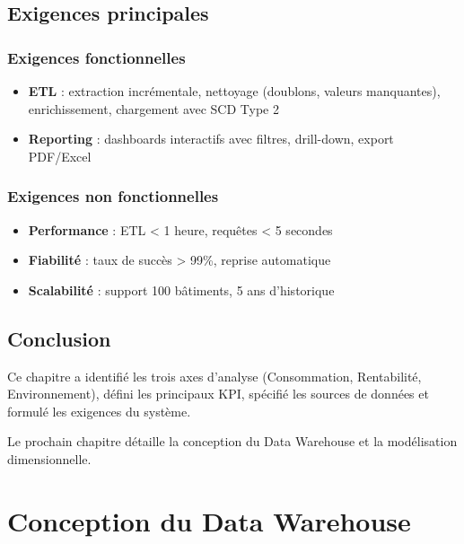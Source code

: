 \documentclass[12pt,a4paper]{report}
\begin{document}
\section{Exigences principales}

\subsection{Exigences fonctionnelles}

\begin{itemize}
    \item \textbf{ETL} : extraction incrémentale, nettoyage (doublons, valeurs manquantes), enrichissement, chargement avec SCD Type 2
    \item \textbf{Reporting} : dashboards interactifs avec filtres, drill-down, export PDF/Excel
\end{itemize}

\subsection{Exigences non fonctionnelles}

\begin{itemize}
    \item \textbf{Performance} : ETL < 1 heure, requêtes < 5 secondes
    \item \textbf{Fiabilité} : taux de succès > 99\%, reprise automatique
    \item \textbf{Scalabilité} : support 100 bâtiments, 5 ans d'historique
\end{itemize}

\section{Conclusion}

Ce chapitre a identifié les trois axes d'analyse (Consommation, Rentabilité, Environnement), défini les principaux KPI, spécifié les sources de données et formulé les exigences du système.

Le prochain chapitre détaille la conception du Data Warehouse et la modélisation dimensionnelle.

\cleardoublepage



\chapter{Conception du Data Warehouse}
\end{document}
